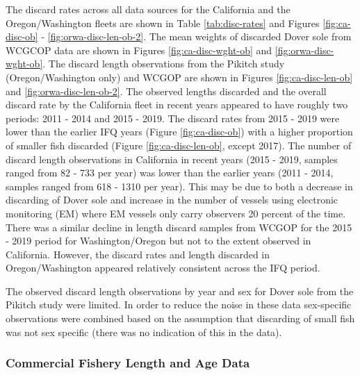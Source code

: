 \documentclass[11pt,
  english,
  a4paper,
]{article}
\begin{document}
\leavevmode\tagmcend\tagstructend\par


The discard rates across all data sources for the California and the Oregon/Washington fleets are shown in Table \ref{tab:disc-rates} and Figures \ref{fig:ca-disc-ob} - \ref{fig:orwa-disc-len-ob-2}. The mean weights of discarded Dover sole from WCGCOP data are shown in Figures \ref{fig:ca-disc-wght-ob} and \ref{fig:orwa-disc-wght-ob}. The discard length observations from the Pikitch study (Oregon/Washington only) and WCGOP are shown in Figures \ref{fig:ca-disc-len-ob} and \ref{fig:orwa-disc-len-ob-2}. The observed lengths discarded and the overall discard rate by the California fleet in recent years appeared to have roughly two periods: 2011 - 2014 and 2015 - 2019. The discard rates from 2015 - 2019 were lower than the earlier IFQ years (Figure \ref{fig:ca-disc-ob}) with a higher proportion of smaller fish discarded (Figure \ref{fig:ca-disc-len-ob}, except 2017). The number of discard length observations in California in recent years (2015 - 2019, samples ranged from 82 - 733 per year) was lower than the earlier years (2011 - 2014, samples ranged from 618 - 1310 per year). This may be due to both a decrease in discarding of Dover sole and increase in the number of vessels using electronic monitoring (EM) where EM vessels only carry observers 20 percent of the time. There was a similar decline in length discard samples from WCGOP for the 2015 - 2019 period for Washington/Oregon but not to the extent observed in California. However, the discard rates and length discarded in Oregon/Washington appeared relatively consistent across the IFQ period.

\leavevmode\tagmcend\tagstructend\par


The observed discard length observations by year and sex for Dover sole from the Pikitch study were limited. In order to reduce the noise in these data sex-specific observations were combined based on the assumption that discarding of small fish was not sex specific (there was no indication of this in the data).

\leavevmode\tagmcend\tagstructend\par


\hypertarget{commercial-fishery-length-and-age-data}{%
\subsubsection{Commercial Fishery Length and Age Data}\label{commercial-fishery-length-and-age-data}}
\end{document}
